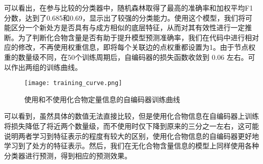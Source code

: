 可以看出，在参与比较的分类器中，随机森林取得了最高的准确率和加权平均F1分数，达到了0.685和0.69，显示出了较强的分类能力。使用这个模型，我们将可能区分一个新处方是否具有与成方相似的底层特征，从而对其有效性进行一定推断。为了判断化合物含量是否有助于提升模型预测准确率，我们在代码中进行相对应的修改，不再使用权重信息，即将每个关联边的点权重都设置为1。由于节点权重的数量级不同，在50个训练周期后，自编码器的损失函数收敛到 $0.06$ 左右。可以作出两组的训练曲线。

\begin{figure}[htbp]
  \centering
  \texttt{[image: training\_curve.png]}
  \caption{使用和不使用化合物定量信息的自编码器训练曲线}
  \label{fig:ae_train_curve}
\end{figure}

可以看到，虽然具体的数值无法直接比较，但是使用化合物信息在自编码器上训练将损失降低了将近两个数量级，而不使用时仅下降到原来的三分之一左右，这可能说明两者学习到特征表示的程度有较大的区别，使用化合物信息的自编码器更好地学习到了处方的特征表示。然后，我们在无化合物含量信息的模型上同样使用各种分类器进行预测，得到相应的预测效果。

